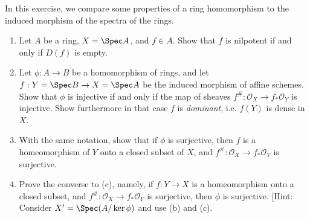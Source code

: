 \begin{exercise}%
	In this exercise, we compare some properties of a ring homomorphism to the induced morphism of the spectra of the rings.
	\begin{enumerate}
		\item Let $A $ be a ring, $X  = \Spec A$, and $f \in A $. Show that $f $ is nilpotent if and only if $D(f) $ is empty.
		\item Let $\phi :A\to B $ be a homomorphism of rings, and let $f: Y = \Spec B \to X = \Spec A $ be the induced morphism of affine schemes. Show that $\phi  $ is injective if and only if the map of sheaves $f^\#: \mathscr{O}_X \to f_\ast \mathscr{O}_Y $ is injective. Show furthermore in that case $f $ is \textit{dominant}, i.e. $f(Y) $ is dense in $X $.
		\item With the same notation, show that if $\phi  $ is surjective, then $f $ is a homeomorphism of $Y $ onto a closed subset of $X $, and $f^\#: \mathscr{O}_X\to f_\ast \mathscr{O}_Y$ is surjective.
		\item Prove the converse to (c), namely, if $f: Y\to X $ is a homeomorphism onto a closed subset, and $f^\#: \mathscr{O}_X\to f_\ast \mathscr{O}_Y $ is surjective, then $\phi  $ is surjective.
			[Hint: Consider $X' = \Spec(A / \ker \phi)$ and use (b) and (c).
	\end{enumerate}
\end{exercise}
